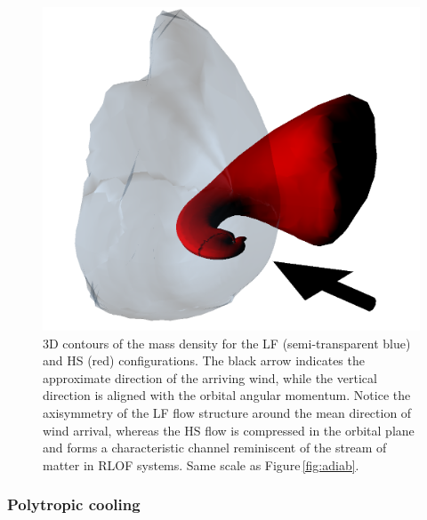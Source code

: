 \documentclass{aa}
\makeatletter
\newcommand*{\rlof}{RLOF\@\xspace}
\makeatother
\begin{document}
\begin{figure}
\centering
\includegraphics[width=0.99\columnwidth]{Pictures/iso-rho_adiab.png}
\caption{3D contours of the mass density for the LF (semi-transparent blue) and HS (red) configurations. The black arrow indicates the approximate direction of the arriving wind, while the vertical direction is aligned with the orbital angular momentum. Notice the axisymmetry of the LF flow structure around the mean direction of wind arrival, whereas the HS flow is compressed in the orbital plane and forms a characteristic channel reminiscent of the stream of matter in \rlof systems. Same scale as Figure\,\ref{fig:adiab}.}
\label{fig:3D_adiab}
\end{figure} 

\subsubsection{Polytropic cooling}
\label{sec:cool_T}
\end{document}
